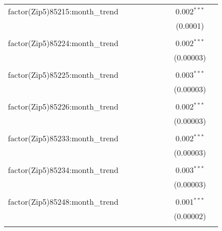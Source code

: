 \begin{table}[H]
{\begin{tabular}{@{\extracolsep{5pt}}lcccccccc}
  factor(Zip5)85215:month\_trend &  &  &  &  &  &  & 0.002$^{***}$ &  \\  

   &  &  &  &  &  &  & (0.0001) &  \\  

   & & & & & & & & \\  

  factor(Zip5)85224:month\_trend &  &  &  &  &  &  & 0.002$^{***}$ &  \\  

   &  &  &  &  &  &  & (0.00003) &  \\  

   & & & & & & & & \\  

  factor(Zip5)85225:month\_trend &  &  &  &  &  &  & 0.003$^{***}$ &  \\  

   &  &  &  &  &  &  & (0.00003) &  \\  

   & & & & & & & & \\  

  factor(Zip5)85226:month\_trend &  &  &  &  &  &  & 0.002$^{***}$ &  \\  

   &  &  &  &  &  &  & (0.00003) &  \\  

   & & & & & & & & \\  

  factor(Zip5)85233:month\_trend &  &  &  &  &  &  & 0.002$^{***}$ &  \\  

   &  &  &  &  &  &  & (0.00003) &  \\  

   & & & & & & & & \\  

  factor(Zip5)85234:month\_trend &  &  &  &  &  &  & 0.003$^{***}$ &  \\  

   &  &  &  &  &  &  & (0.00003) &  \\  

   & & & & & & & & \\  

  factor(Zip5)85248:month\_trend &  &  &  &  &  &  & 0.001$^{***}$ &  \\  

   &  &  &  &  &  &  & (0.00002) &  \\  

   & & & & & & & & \\  


\end{tabular}}
\end{table}
